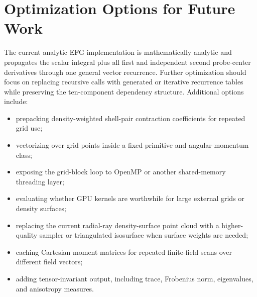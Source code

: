 \documentclass[journal=jcisd8,manuscript=suppinfo]{achemso}
\begin{document}
\section{Optimization Options for Future Work}

The current analytic EFG implementation is mathematically analytic and propagates the scalar integral plus all first and independent second probe-center derivatives through one general vector recurrence.  Further optimization should focus on replacing recursive calls with generated or iterative recurrence tables while preserving the ten-component dependency structure.  Additional options include:
\begin{itemize}
  \item prepacking density-weighted shell-pair contraction coefficients for repeated grid use;
  \item vectorizing over grid points inside a fixed primitive and angular-momentum class;
  \item exposing the grid-block loop to OpenMP or another shared-memory threading layer;
  \item evaluating whether GPU kernels are worthwhile for large external grids or density surfaces;
  \item replacing the current radial-ray density-surface point cloud with a higher-quality sampler or triangulated isosurface when surface weights are needed;
  \item caching Cartesian moment matrices for repeated finite-field scans over different field vectors;
  \item adding tensor-invariant output, including trace, Frobenius norm,
  eigenvalues, and anisotropy measures.
\end{itemize}
\end{document}
